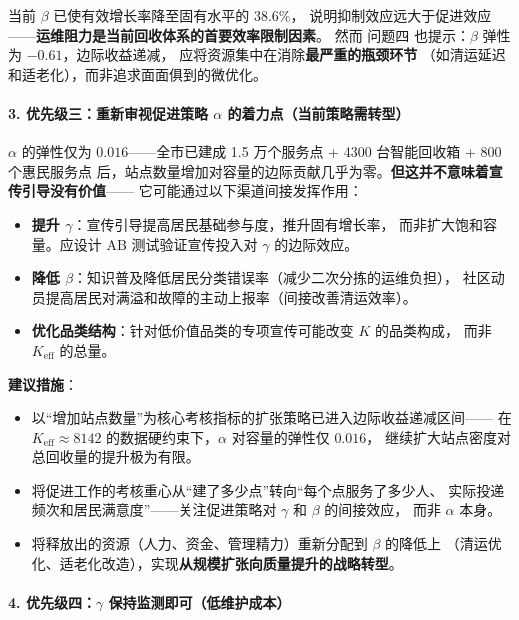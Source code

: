 \documentclass[12pt,a4paper]{ctexart}
\begin{document}
当前 $\beta$ 已使有效增长率降至固有水平的 $38.6\%$，
说明抑制效应远大于促进效应——\textbf{运维阻力是当前回收体系的首要效率限制因素}。
然而 问题四 也提示：$\beta$ 弹性为 $-0.61$，边际收益递减，
应将资源集中在消除\textbf{最严重的瓶颈环节}
（如清运延迟和适老化），而非追求面面俱到的微优化。

\paragraph*{3. 优先级三：重新审视促进策略 $\alpha$ 的着力点（当前策略需转型）}

$\alpha$ 的弹性仅为 $0.016$——全市已建成 1.5 万个服务点 + 4300 台智能回收箱 + 800 个惠民服务点
后，站点数量增加对容量的边际贡献几乎为零。\textbf{但这并不意味着宣传引导没有价值}——
它可能通过以下渠道间接发挥作用：

\begin{itemize}
  \item \textbf{提升 $\gamma$}：宣传引导提高居民基础参与度，推升固有增长率，
        而非扩大饱和容量。应设计 AB 测试验证宣传投入对 $\gamma$ 的边际效应。
  \item \textbf{降低 $\beta$}：知识普及降低居民分类错误率（减少二次分拣的运维负担），
        社区动员提高居民对满溢和故障的主动上报率（间接改善清运效率）。
  \item \textbf{优化品类结构}：针对低价值品类的专项宣传可能改变 $K$ 的品类构成，
        而非 $K_{\text{eff}}$ 的总量。
\end{itemize}

\textbf{建议措施}：
\begin{itemize}
  \item 以``增加站点数量''为核心考核指标的扩张策略已进入边际收益递减区间——
        在 $K_{\text{eff}} \approx 8142$ 的数据硬约束下，$\alpha$ 对容量的弹性仅 $0.016$，
        继续扩大站点密度对总回收量的提升极为有限。
  \item 将促进工作的考核重心从``建了多少点''转向``每个点服务了多少人、
        实际投递频次和居民满意度''——关注促进策略对 $\gamma$ 和 $\beta$ 的间接效应，
        而非 $\alpha$ 本身。
  \item 将释放出的资源（人力、资金、管理精力）重新分配到 $\beta$ 的降低上
        （清运优化、适老化改造），实现\textbf{从规模扩张向质量提升的战略转型}。
\end{itemize}

\paragraph*{4. 优先级四：$\gamma$ 保持监测即可（低维护成本）}
\end{document}
